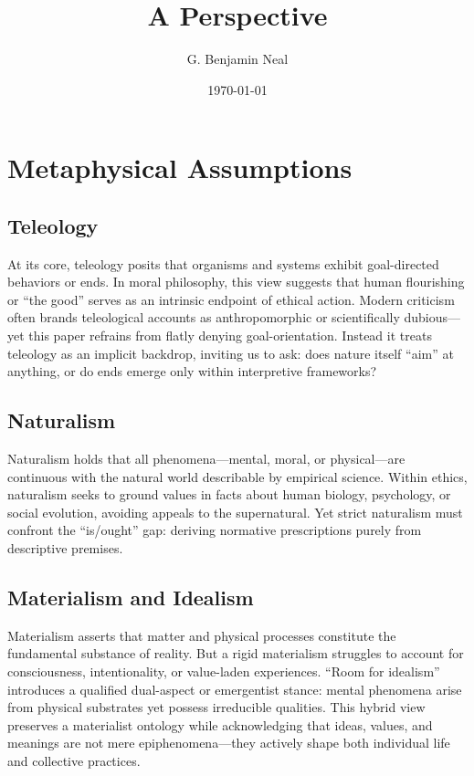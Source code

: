 \documentclass[a4paper]{article}
\begin{document}
\title{A Perspective}
\author{G. Benjamin Neal}
\date{\today}
\maketitle

\begin{abstract}
\end{abstract}

\section{Metaphysical Assumptions}
\subsection{Teleology}
At its core, teleology posits that organisms and systems exhibit goal-directed behaviors or ends. 
In moral philosophy, this view suggests that human flourishing or “the good” serves as an intrinsic endpoint of ethical action. 
Modern criticism often brands teleological accounts as anthropomorphic or scientifically dubious—yet this paper refrains from flatly denying goal-orientation. 
Instead it treats teleology as an implicit backdrop, inviting us to ask: does nature itself “aim” at anything, or do ends emerge only within interpretive frameworks?

\subsection{Naturalism}
Naturalism holds that all phenomena—mental, moral, or physical—are continuous with the natural world describable by empirical science. 
Within ethics, naturalism seeks to ground values in facts about human biology, psychology, or social evolution, avoiding appeals to the supernatural. 
Yet strict naturalism must confront the “is/ought” gap: deriving normative prescriptions purely from descriptive premises. 

\subsection{Materialism and Idealism}
Materialism asserts that matter and physical processes constitute the fundamental substance of reality. 
But a rigid materialism struggles to account for consciousness, intentionality, or value-laden experiences. 
“Room for idealism” introduces a qualified dual-aspect or emergentist stance: mental phenomena arise from physical substrates yet possess irreducible qualities. 
This hybrid view preserves a materialist ontology while acknowledging that ideas, values, and meanings are not mere epiphenomena—they actively shape both individual life and collective practices.
\end{document}
